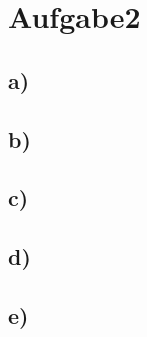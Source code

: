 \newpage
\section{Aufgabe2}
\label{sec:a2}

\subsection{a)}
\label{subsec:a2a}

\subsection{b)}
\label{subsec:a2b}

\subsection{c)}
\label{subsec:a2c}

\subsection{d)}
\label{subsec:a2d}


\subsection{e)}
\label{subsec:a2e}
